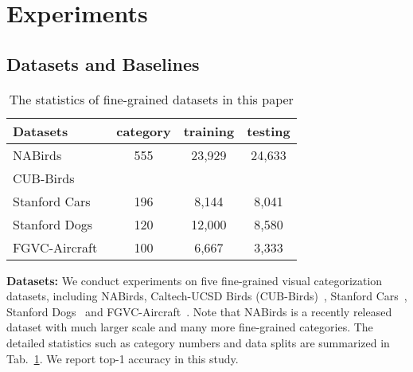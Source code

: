 \documentclass[10pt,twocolumn,letterpaper]{article}
\begin{document}
\section{Experiments}
\label{sec:exp}

\subsection{Datasets and Baselines}
\label{sec:datasets}

\begin{table}
\small
\begin{center}
\begin{tabular}{|l|c|c|c|}
\hline
Datasets & category & training & testing \\
\hline\hline
NABirds\cite{nabirds15Perona} & 555 & 23,929 &24,633\\
\hline
CUB-Birds~\cite{cubbirds11caltech} &  &  &  \\
\hline
Stanford Cars~\cite{stcars13feifei} & 196 & 8,144 &8,041 \\
\hline
Stanford Dogs~\cite{stdogs11feifei} & 120 & 12,000 &8,580\\
\hline
FGVC-Aircraft~\cite{vggaircraft13Vedaldi} & 100 & 6,667 &3,333\\
\hline
\end{tabular}
\end{center}
\caption{The statistics of fine-grained datasets in this paper}
\label{tab:datasets}
\end{table}

\textbf{Datasets:} We conduct experiments on five fine-grained visual categorization datasets, including NABirds\cite{nabirds15Perona}, Caltech-UCSD Birds (CUB-Birds)~\cite{cubbirds11caltech}, Stanford Cars~\cite{stcars13feifei}, Stanford Dogs~\cite{stdogs11feifei} and  FGVC-Aircraft~\cite{vggaircraft13Vedaldi}. Note that NABirds is a recently released dataset with much larger scale and many more  fine-grained categories. The detailed statistics such as category numbers and data splits are summarized in Tab.~\ref{tab:datasets}. We report top-1 accuracy in this study. 
\end{document}
